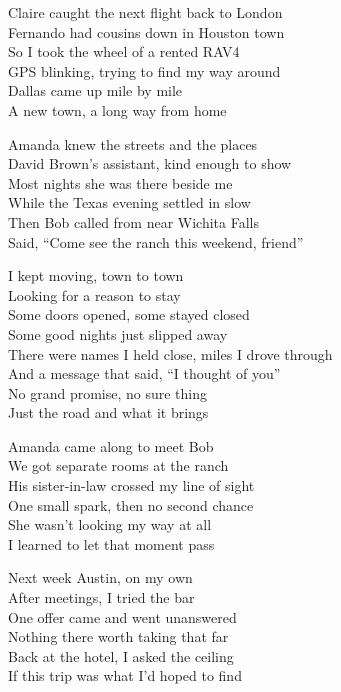 \begin{lyrics}
Claire caught the next flight back to London\\
Fernando had cousins down in Houston town\\
So I took the wheel of a rented RAV4\\
GPS blinking, trying to find my way around\\
Dallas came up mile by mile\\
A new town, a long way from home

Amanda knew the streets and the places\\
David Brown’s assistant, kind enough to show\\
Most nights she was there beside me\\
While the Texas evening settled in slow\\
Then Bob called from near Wichita Falls\\
Said, “Come see the ranch this weekend, friend”

I kept moving, town to town\\
Looking for a reason to stay\\
Some doors opened, some stayed closed\\
Some good nights just slipped away\\
There were names I held close, miles I drove through\\
And a message that said, “I thought of you”\\
No grand promise, no sure thing\\
Just the road and what it brings

Amanda came along to meet Bob\\
We got separate rooms at the ranch\\
His sister-in-law crossed my line of sight\\
One small spark, then no second chance\\
She wasn’t looking my way at all\\
I learned to let that moment pass

Next week Austin, on my own\\
After meetings, I tried the bar\\
One offer came and went unanswered\\
Nothing there worth taking that far\\
Back at the hotel, I asked the ceiling\\
If this trip was what I’d hoped to find


\end{lyrics}
